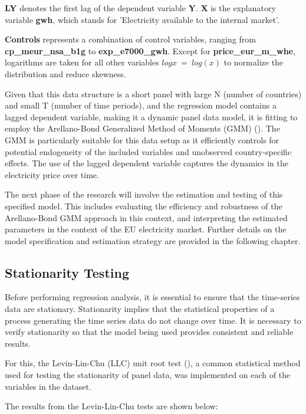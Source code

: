 \documentclass[12pt]{article}
\begin{document}
\textbf{LY} denotes the first lag of the dependent variable \textbf{Y}. \textbf{X} is the explanatory variable \textbf{gwh}, which stands for 'Electricity available to the internal market'.

\textbf{Controls} represents a combination of control variables, ranging from \textbf{cp\_meur\_nsa\_b1g} to \textbf{exp\_e7000\_gwh}. Except for \textbf{price\_eur\_m\_whe}, logarithms are taken for all other variables $logx\ =\ log(x)$ to normalize the distribution and reduce skewness.

Given that this data structure is a short panel with large N (number of countries) and small T (number of time periods), and the regression model contains a lagged dependent variable, making it a dynamic panel data model, it is fitting to employ the Arellano-Bond Generalized Method of Moments (GMM) (\cite{arellano1991some}). The GMM is particularly suitable for this data setup as it efficiently controls for potential endogeneity of the included variables and unobserved country-specific effects. The use of the lagged dependent variable captures the dynamics in the electricity price over time.

The next phase of the research will involve the estimation and testing of this specified model. This includes evaluating the efficiency and robustness of the Arellano-Bond GMM approach in this context, and interpreting the estimated parameters in the context of the EU electricity market. Further details on the model specification and estimation strategy are provided in the following chapter.

\subsection{Stationarity Testing}

Before performing regression analysis, it is essential to ensure that the time-series data are stationary. Stationarity implies that the statistical properties of a process generating the time series data do not change over time. It is necessary to verify stationarity so that the model being used provides consistent and reliable results.

For this, the Levin-Lin-Chu (LLC) unit root test (\cite{levin2002unit}), a common statistical method used for testing the stationarity of panel data, was implemented on each of the variables in the dataset.

The results from the Levin-Lin-Chu tests are shown below:
\end{document}
